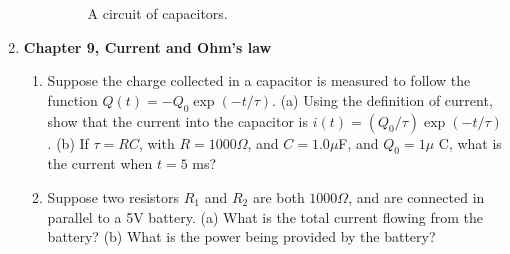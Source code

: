 \documentclass[10pt]{article}
\begin{document}
\begin{enumerate}
\begin{enumerate}
\begin{figure}
\caption{\label{fig:cap2} A circuit of capacitors.}
\end{figure}
\end{enumerate}
\item \textbf{Chapter 9, Current and Ohm's law}
\begin{enumerate}
\item Suppose the charge collected in a capacitor is measured to follow the function $Q(t) = - Q_0 \exp(-t/\tau)$.  (a) Using the definition of current, show that the current into the capacitor is $i(t) = (Q_0/\tau) \exp(-t/\tau)$.  (b) If $\tau = RC$, with $R = 1000\Omega$, and $C = 1.0\mu$F, and $Q_0 = 1\mu$ C, what is the current when $t = 5$ ms? \\ \vspace{2.5cm}
\item Suppose two resistors $R_1$ and $R_2$ are both $1000 \Omega$, and are connected in parallel to a 5V battery.  (a) What is the total current flowing from the battery? (b) What is the power being provided by the battery?
\end{enumerate}
\end{enumerate}
\end{document}
